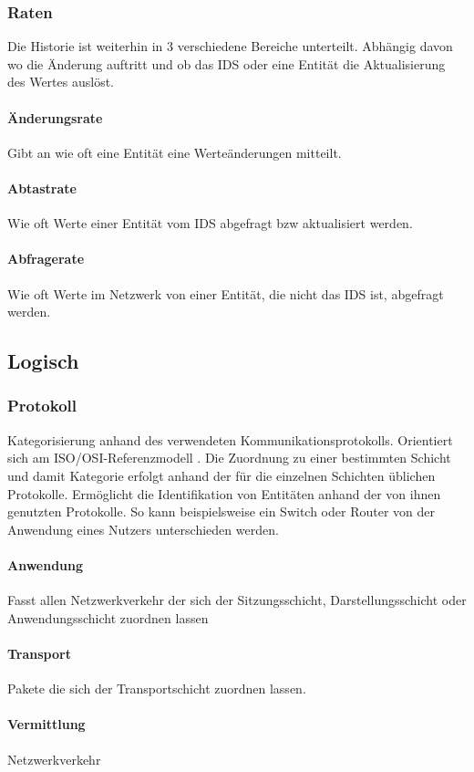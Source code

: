 \subsubsection{Raten}
Die Historie ist weiterhin in 3 verschiedene Bereiche unterteilt. Abhängig davon wo die Änderung auftritt und ob das IDS oder eine Entität die Aktualisierung des Wertes auslöst.
\paragraph{Änderungsrate} 
Gibt an wie oft eine Entität eine Werteänderungen mitteilt.
\paragraph{Abtastrate}
Wie oft Werte einer Entität vom IDS abgefragt bzw aktualisiert werden.
\paragraph{Abfragerate}
Wie oft Werte im Netzwerk von einer Entität, die nicht das IDS ist, abgefragt werden.

\subsection{Logisch}
\subsubsection{Protokoll}
Kategorisierung anhand des verwendeten Kommunikationsprotokolls. Orientiert sich am ISO/OSI-Referenzmodell \cite{day1983osi}. Die Zuordnung zu einer bestimmten Schicht und damit Kategorie erfolgt anhand der für die einzelnen Schichten üblichen Protokolle. Ermöglicht die Identifikation von Entitäten anhand der von ihnen genutzten Protokolle. So kann beispielsweise ein Switch oder Router von der Anwendung eines Nutzers unterschieden werden.
\paragraph{Anwendung}
Fasst allen Netzwerkverkehr der sich der Sitzungsschicht, Darstellungsschicht oder Anwendungsschicht zuordnen lassen
\paragraph{Transport}
Pakete die sich der Transportschicht zuordnen lassen.
\paragraph{Vermittlung}
Netzwerkverkehr 


